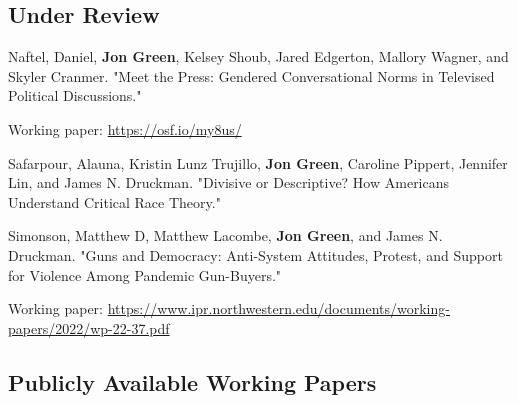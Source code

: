 \documentclass[letterpaper]{article}
\renewenvironment{itemize}{
  \begin{list}{}{
    \setlength{\leftmargin}{1.5em}
  }
}{
  \end{list}
}
\begin{document}
\subsection*{Under Review}
\begin{itemize}

\item Naftel, Daniel, \textbf{Jon Green}, Kelsey Shoub, Jared Edgerton, Mallory Wagner, and Skyler Cranmer. "Meet the Press: Gendered Conversational Norms in Televised Political Discussions." %
\begin{itemize}
\item Working paper: \url{https://osf.io/my8us/}
\end{itemize}

\item Safarpour, Alauna, Kristin Lunz Trujillo, \textbf{Jon Green}, Caroline Pippert, Jennifer Lin, and James N. Druckman. "Divisive or Descriptive? How Americans Understand Critical Race Theory."

\item Simonson, Matthew D, Matthew Lacombe, \textbf{Jon Green}, and James N. Druckman. "Guns and Democracy: Anti-System Attitudes, Protest, and Support for Violence Among Pandemic Gun-Buyers."
\begin{itemize}
\item Working paper: \url{https://www.ipr.northwestern.edu/documents/working-papers/2022/wp-22-37.pdf}
\end{itemize}


\end{itemize}

\subsection*{Publicly Available Working Papers}
\end{document}
